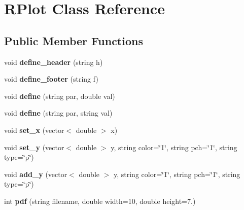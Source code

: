 \hypertarget{classRPlot}{}\section{R\+Plot Class Reference}
\label{classRPlot}
\subsection*{Public Member Functions}
\begin{DoxyCompactItemize}
\item 
\hypertarget{classRPlot_a86981eba64a9b138a5856c76aa14059a}{}void {\bfseries define\+\_\+header} (string h)\label{classRPlot_a86981eba64a9b138a5856c76aa14059a}

\item 
\hypertarget{classRPlot_aa4e6d065ffc5cb6d234bb72a23563a38}{}void {\bfseries define\+\_\+footer} (string f)\label{classRPlot_aa4e6d065ffc5cb6d234bb72a23563a38}

\item 
\hypertarget{classRPlot_a0b0ce5474847d7b1947126c6975e07c4}{}void {\bfseries define} (string par, double val)\label{classRPlot_a0b0ce5474847d7b1947126c6975e07c4}

\item 
\hypertarget{classRPlot_a486fe81dc519208ef2243aa38346ac37}{}void {\bfseries define} (string par, string val)\label{classRPlot_a486fe81dc519208ef2243aa38346ac37}

\item 
\hypertarget{classRPlot_adc0785839f48e5b8cd8a15a26ed69aba}{}void {\bfseries set\+\_\+x} (vector$<$ double $>$ x)\label{classRPlot_adc0785839f48e5b8cd8a15a26ed69aba}

\item 
\hypertarget{classRPlot_aec0a33b9b55359e1245cadd26279544e}{}void {\bfseries set\+\_\+y} (vector$<$ double $>$ y, string color=\char`\"{}1\char`\"{}, string pch=\char`\"{}1\char`\"{}, string type=\char`\"{}p\char`\"{})\label{classRPlot_aec0a33b9b55359e1245cadd26279544e}

\item 
\hypertarget{classRPlot_ac2af6bb29d7a64f8b4a06f4529729350}{}void {\bfseries add\+\_\+y} (vector$<$ double $>$ y, string color=\char`\"{}1\char`\"{}, string pch=\char`\"{}1\char`\"{}, string type=\char`\"{}p\char`\"{})\label{classRPlot_ac2af6bb29d7a64f8b4a06f4529729350}

\item 
\hypertarget{classRPlot_ab83248b865eb569cc16023a0bbbf7353}{}int {\bfseries pdf} (string filename, double width=10, double height=7.)\label{classRPlot_ab83248b865eb569cc16023a0bbbf7353}


\end{DoxyCompactItemize}
